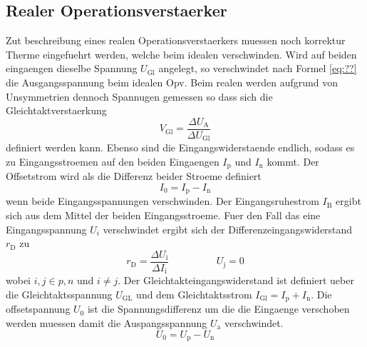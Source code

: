 \subsection{Realer Operationsverstaerker}%
\label{sub:realer_operationsverstaerker}

Zut beschreibung eines realen Operationsverstaerkers muessen noch korrektur
Therme eingefuehrt werden, welche beim idealen verschwinden. 
Wird auf beiden eingaengen dieselbe Spannung $U_\text{Gl}$ angelegt, so
verschwindet nach Formel \ref{eq:??} die Ausgangsspannung beim idealen Opv. 
Beim realen werden aufgrund von Unsymmetrien dennoch Spannugen gemessen so dass
sich die Gleichtaktverstaerkung 
\begin{equation}
		V_\text{Gl} = \frac{\Delta U_\text{A}}{\Delta U_\text{Gl}}
\end{equation}
definiert werden kann.
Ebenso sind die Eingangswiderstaende endlich, sodass es zu Eingangsstroemen auf
den beiden Eingaengen $I_\text{p}$ und $I_\text{n}$ kommt.
Der Offsetstrom wird als die Differenz beider Stroeme definiert 
\begin{equation}
		I_0 = I_\text{p} - I_\text{n}
\end{equation}
wenn beide Eingangsspannungen verschwinden. 
Der Eingangsruhestrom $I_\text{B}$ ergibt sich aus dem Mittel der beiden Eingangsstroeme.
Fuer den Fall das eine Eingangsspannung $U_{i}$ verschwindet ergibt sich der
Differenzeingangswiderstand $r_\text{D}$ zu
\begin{equation}
		r_\text{D} = \frac{\Delta U_\text{i}}{\Delta I_\text{i}} \hspace{2cm} U_\text{j} = 0 
\end{equation}
wobei $i,j \in p,n$ und $i \neq j$.
Der Gleichtakteingangswiderstand ist definiert ueber die Gleichtaktsspannung
$U_\text{GL}$ und dem Gleichtaktsstrom $I_\text{Gl} = I_\text{p} + I_\text{n}$.
Die offsetspannung $U_0$ ist die Spannungsdifferenz um die die Eingaenge
verschoben werden muessen damit die Auspangsspannung $U_\text{a}$ verschwindet.
\begin{equation}
		U_0 = U_\text{p} - U_\text{n}
\end{equation}

